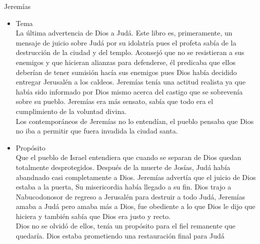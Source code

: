 \begin{section}{Jeremías}
\begin{itemize}
Se destaca el anuncio por primera vez que se hace de un nuevo pacto, iba a ser diferente ya que Dios no grabaría su ley sobre piedra sino que las iba a escribir en los corazones de su pueblo, produciendo asi la capacidad de conocer a Dios y serle fiel. El antiguo pacto había sido invalidado por Su pueblo, por su desobediencia.\\
La fidelidad de Dios era muy clara pero ellos no le fueron fieles a Dios. En Jeremías 18 se hace la ilustración con la relación que hay entre un alfarero y el barro, en Jeremías 13 se lilustra la sobrerbia de Judá con un cinto de lino podrido. Dios hace ilustraciones por medio de Jeremías en estos capítulos y otros más acerca de la condición espiritual del pueblo. Jeremías es cuidadoso diciendo que el arrepentimiento podía evitar dicho juicio.\\
Dios les daría un nuevo pacto y escribiría Su ley en sus corazones, el trono de David sería restablecido.
		\item Tema\\
			La última advertencia de Dios a Judá. Este libro es, primeramente, un mensaje de juicio sobre Judá por su idolatría pues el profeta sabía de la destrucción de la ciudad y del templo. Aconsejó que no se resistieran a sus enemigos y que hicieran alianzas para defenderse, él predicaba que ellos deberían de tener sumisión hacía sus enemigos pues Dios había decidido entregar Jerusalén a los caldeos. Jeremías tenía una actitud realista ya que había sido informado por Dios mismo acerca del castigo que se sobrevenía sobre su pueblo. Jeremías era más sensato, sabía que todo era el cumplimiento de la voluntad divina.\\
			Los contemporáneos de Jeremías no lo entendían, el pueblo pensaba que Dios no iba a permitir que fuera invadida la ciudad santa. 
		\item Propósito\\
			Que el pueblo de Israel entendiera que cuando se separan de Dios quedan totalmente desprotegidos. Después de la muerte de Josías, Judá había abandnado casi completamente a Dios. 
			\newpage
			Jeremías advertía que el juicio de Dios estaba a la puerta, Su misericordia había llegado a su fin. Dios trajo a Nabucodonosor de regreso a Jerusalén para destruir a todo Judá, Jeremías amaba a Judá pero amaba más a Dios, fue obediente a lo que Dios le dijo que hiciera y también sabía que Dios era justo y recto.\\
			Dios no se olvidó de ellos, tenía un propósito para el fiel remanente que quedaría. Dios estaba prometiendo una restauración final para Judá

\end{itemize}
\end{section}
